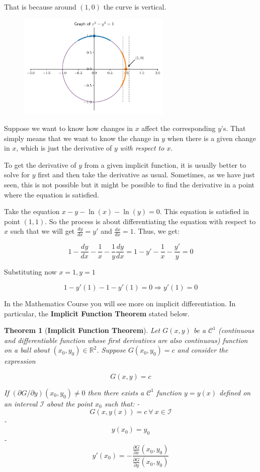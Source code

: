 \documentclass[a4paper,11pt]{article}
\theoremstyle{definition}
\theoremstyle{plain}
\newtheorem{theorem}{Theorem}
\begin{document}
That is because around \((1,0)\) the curve is vertical.

    \begin{figure}[htbp]
    	\centering 
    		\includegraphics[width = 0.65\textwidth]{Ch2_files/Ch2_17_0.pdf}
    \end{figure}
    
    Suppose we want to know how changes in \(x\) affect the corresponding
\(y\)'s. That simply means that we want to know the change in \(y\) when
there is a given change in \(x\), which is just the derivative of \(y\)
\emph{with respect to \(x\)}.

To get the derivative of \(y\) from a given implicit function, it is
usually better to solve for \(y\) first and then take the derivative as
usual. Sometimes, as we have just seen, this is not possible but it
might be possible to find the derivative in a point where the equation
is satisfied.

Take the equation \(x-y-\ln(x)-\ln(y) = 0\). This equation is satisfied
in point \((1,1)\). So the process is about differentiating the equation
with respect to \(x\) such that we will get \(\frac{dy}{dx} = y'\) and
\(\frac{dx}{dx} = 1\). Thus, we get:

\[
1 - \frac{dy}{dx}-\frac{1}{x}-\frac{1}{y}\frac{dy}{dx} = 1 - y' - \frac{1}{x}-\frac{y'}{y} = 0
\]

Substituting now \(x = 1, y = 1\)

\[
1 - y'(1) - 1 - y'(1) = 0 \Rightarrow y'(1) = 0
\]

In the Mathematics Course you will see more on implicit differentiation.
In particular, the \textbf{Implicit Function Theorem} stated below.

\begin{theorem}[\textbf{Implicit Function Theorem}] 
Let \(G(x, y)\) be a \(\mathcal{C}^1\) (continuous and differentiable function whose first
derivatives are also continuous) function on a ball about
\((x_0, y_0)\in\mathbb{R}^2\). Suppose \(G(x_0, y_0) = c\) and consider
the expression

\[
G(x, y) = c
\]

If \(\left(\partial G / \partial y\right)(x_0, y_0) \neq 0\) then there
exists a \(\mathcal{C}^1\) function \(y = y(x)\) defined on an interval
\(\mathcal{I}\) about the point \(x_0\) such that: -
\[G\left(x,y(x)\right) = c \ \forall \ x\in\mathcal{I}\] -
\[y(x_0) = y_0\] -
\[y'(x_0) = -\frac{\frac{\partial G}{\partial x}(x_0, y_0)}{\frac{\partial G}{\partial y}(x_0, y_0)}\]
\end{theorem}
\end{document}

